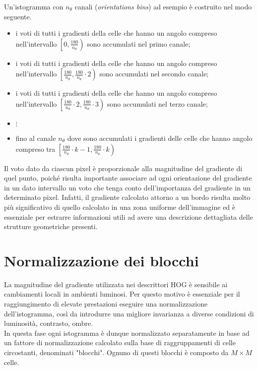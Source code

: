 Un'istogramma con $n_{\theta}$ canali (\emph{orientations bins}) ad esempio è costruito nel modo seguente.
\begin{itemize} 
 \item i voti di tutti i gradienti della celle che hanno un angolo compreso nell'intervallo $\left [0, \frac{180}{n_{\theta}}\right )$ sono accumulati nel primo canale;
 \item i voti di tutti i gradienti della celle che hanno un angolo compreso nell'intervallo $\left [\frac{180}{n_{\theta}}, \frac{180}{n_{\theta}}\cdot 2\right )$ sono accumulati nel secondo canale;
 \item i voti di tutti i gradienti della celle che hanno un angolo compreso nell'intervallo $\left [\frac{180}{n_{\theta}}\cdot 2,\frac{180}{n_{\theta}}\cdot 3\right )$ sono accumulati nel terzo canale;
 \item[] $\vdots$
 \item fino al canale $n_{\theta}$ dove sono accumulati i gradienti delle celle che hanno angolo compreso tra $\left [\frac{180}{n_{\theta}}\cdot {k-1},\frac{180}{n_{\theta}}\cdot k\right )$
 \end{itemize}

Il voto dato da ciascun pixel è proporzionale alla magnitudine del gradiente di quel punto, poiché risulta importante associare ad ogni orientazione del gradiente in un dato intervallo un voto che tenga conto dell'importanza del gradiente in un determinato pixel. 
Infatti, il gradiente calcolato attorno a un bordo risulta molto più significativo di quello calcolato in una zona uniforme dell'immagine ed è essenziale per estrarre informazioni utili ad avere una descrizione dettagliata delle strutture geometriche presenti. 

\section{Normalizzazione dei blocchi}
La magnitudine del gradiente utilizzata nei descrittori HOG è sensibile ai cambiamenti locali in ambienti luminosi.
Per questo motivo è essenziale per il raggiungimento di elevate prestazioni eseguire una normalizzazione dell'istogramma, così da introdurre una migliore invarianza a diverse condizioni di luminosità, contrasto, ombre.\\
In questa fase ogni istogramma è dunque normalizzato separatamente in base ad un fattore di normalizzazione calcolato sulla base di raggruppamenti di celle circostanti, denominati "blocchi". Ognuno di questi blocchi è composto da $M \times M$ celle.

